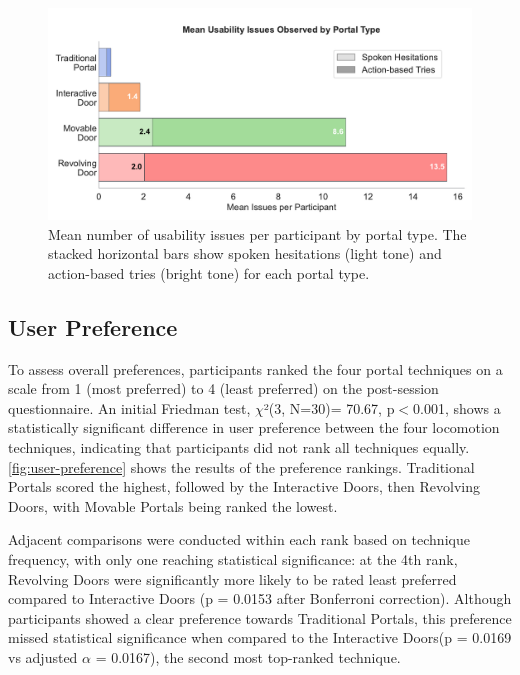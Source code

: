 \begin{figure}[t]
\centering
\includegraphics[width=.8\textwidth]{NOVAthesisFiles/Images/graphs/hesitations_stacked_horizontal_plot.pdf}
\caption{Mean number of usability issues per participant by portal type. The stacked horizontal bars show spoken hesitations (light tone) and action-based tries (bright tone) for each portal type.}
\label{fig:hesitations_plot}
\end{figure}


\subsection{User Preference}

To assess overall preferences, participants ranked the four portal techniques on a scale from 1 (most preferred) to 4 (least preferred) 
on the post-session questionnaire. An initial Friedman test, $\chi$²(3, N=30)= 70.67, p$<$0.001, shows a statistically significant 
difference in user preference between the four locomotion techniques, indicating that participants did not rank all techniques equally. 
\autoref{fig:user-preference} shows the results of the preference rankings. Traditional Portals scored the highest, followed by the 
Interactive Doors, then Revolving Doors, with Movable Portals being ranked the lowest. 

Adjacent comparisons were conducted within each rank based on technique frequency, with only one reaching statistical significance: 
at the 4th rank, Revolving Doors were significantly more likely to be rated least preferred compared to Interactive Doors 
(p = 0.0153 after Bonferroni correction). Although participants showed a clear preference towards Traditional Portals, this 
preference missed statistical significance when compared to the Interactive Doors(p = 0.0169 vs adjusted $\alpha$ = 0.0167), 
the second most top-ranked technique.

